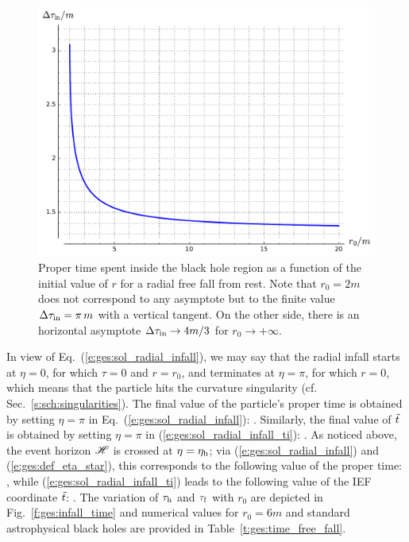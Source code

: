 \begin{figure}
\centerline{\includegraphics[height=0.4\textheight]{ges_time_inside.pdf}}
\caption[]{\label{f:ges:time_inside} \footnotesize
Proper time spent inside the black hole region as a function
of the initial value of $r$ for a radial free fall from rest.
Note that $r_0=2m$ does not correspond to any asymptote but to the
finite value $\Delta\tau_{\rm in} = \pi\, m$ with a vertical tangent.
On the other side, there is an horizontal asymptote
$\Delta\tau_{\rm in} \to 4m/3$ for $r_0\to +\infty$.}
\end{figure}

In view of Eq.~(\ref{e:ges:sol_radial_infall}), we may say that the radial
infall starts at $\eta=0$, for which $\tau=0$ and $r=r_0$, and terminates
at $\eta=\pi$, for which $r=0$, which means that the particle hits the curvature
singularity (cf. Sec.~\ref{s:sch:singularities}).
The final value of the particle's proper time is obtained by
setting $\eta=\pi$ in Eq.~(\ref{e:ges:sol_radial_infall}):
\be
     .
\ee
Similarly, the final value of ${\tilde t}$ is obtained by setting $\eta=\pi$ in (\ref{e:ges:sol_radial_infall_ti}):
\be
     .
\ee
As noticed above, the event horizon $\mathscr{H}$ is crossed at $\eta=\eta_{\rm h}$;
via (\ref{e:ges:sol_radial_infall}) and (\ref{e:ges:def_eta_star}), this corresponds to the following value
of the proper time:
\be
     ,
\ee
while (\ref{e:ges:sol_radial_infall_ti}) leads to the following value
of the IEF coordinate ${\tilde t}$:
\be
     .
\ee
The variation of $\tau_{\rm h}$ and $\tau_{\rm f}$ with $r_0$ are depicted in
Fig.~\ref{f:ges:infall_time} and numerical values for $r_0=6m$ and
standard astrophysical black holes are provided in
Table~\ref{t:ges:time_free_fall}.

